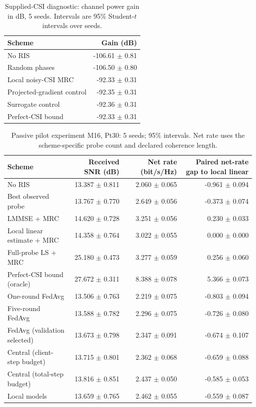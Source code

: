 \begin{table}[t]\centering\small
\caption{Supplied-CSI diagnostic: channel power gain in dB, 5 seeds. Intervals are 95\% Student-$t$ intervals over seeds.}
\begin{tabular}{lr}\toprule Scheme & Gain (dB)\\\midrule
No RIS & -106.61 $\pm$ 0.81 \\
Random phases & -106.50 $\pm$ 0.80 \\
Local noisy-CSI MRC & -92.33 $\pm$ 0.31 \\
Projected-gradient control & -92.35 $\pm$ 0.31 \\
Surrogate control & -92.36 $\pm$ 0.31 \\
Perfect-CSI bound & -92.33 $\pm$ 0.31 \\
\bottomrule\end{tabular}\end{table}
\begin{table}[t]\centering\small
\caption{Passive pilot experiment M16, Pt30: 5 seeds; 95\% intervals. Net rate uses the scheme-specific probe count and declared coherence length.}
\begin{tabular}{lrrr}\toprule Scheme & Received SNR (dB) & Net rate (bit/s/Hz) & Paired net-rate gap to local linear\\\midrule
No RIS & 13.387 $\pm$ 0.811 & 2.060 $\pm$ 0.065 & -0.961 $\pm$ 0.094\\
Best observed probe & 13.767 $\pm$ 0.770 & 2.649 $\pm$ 0.056 & -0.373 $\pm$ 0.074\\
LMMSE + MRC & 14.620 $\pm$ 0.728 & 3.251 $\pm$ 0.056 & 0.230 $\pm$ 0.033\\
Local linear estimate + MRC & 14.358 $\pm$ 0.764 & 3.022 $\pm$ 0.055 & 0.000 $\pm$ 0.000\\
Full-probe LS + MRC & 25.180 $\pm$ 0.473 & 3.277 $\pm$ 0.059 & 0.256 $\pm$ 0.060\\
Perfect-CSI bound (oracle) & 27.672 $\pm$ 0.311 & 8.388 $\pm$ 0.078 & 5.366 $\pm$ 0.073\\
One-round FedAvg & 13.506 $\pm$ 0.763 & 2.219 $\pm$ 0.075 & -0.803 $\pm$ 0.094\\
Five-round FedAvg & 13.588 $\pm$ 0.782 & 2.296 $\pm$ 0.075 & -0.726 $\pm$ 0.080\\
FedAvg (validation selected) & 13.673 $\pm$ 0.798 & 2.347 $\pm$ 0.091 & -0.674 $\pm$ 0.107\\
Central (client-step budget) & 13.715 $\pm$ 0.801 & 2.362 $\pm$ 0.068 & -0.659 $\pm$ 0.088\\
Central (total-step budget) & 13.816 $\pm$ 0.851 & 2.437 $\pm$ 0.050 & -0.585 $\pm$ 0.053\\
Local models & 13.659 $\pm$ 0.765 & 2.462 $\pm$ 0.055 & -0.559 $\pm$ 0.087\\
\bottomrule\end{tabular}\end{table}
